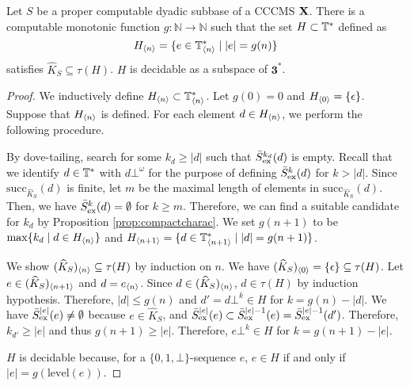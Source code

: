\documentclass{eptcs-modified}
\begin{document}
\begin{lemma}\label{lemma:H}
Let $S$ be a proper computable dyadic subbase of a CCCMS $\mathbf{X}$.
There is a computable monotonic function $g : \mathbb{N} \to \mathbb{N}$ such that
the set $H \subset \mathbb{T}^*$ defined as
$${{H_{{\langle n\rangle}}}} = \{e \in {{\mathbb{T}^*_{{\langle n\rangle}}}} \mid |e| = g(n)\}$$
satisfies $\widehat{K}_S \subseteq \tau(H)$.
$H$ is decidable as a subspace of $\mathbf{3}^*$.
\label{lem:H}

\begin{proof}
We inductively define ${{{H_{{\langle n\rangle}}}}} \subset {{{\mathbb{T}^*_{{\langle n\rangle}}}}}$.
Let $g(0) = 0$ and ${{H_{{\langle0\rangle}}}} = \{\epsilon\}$.
Suppose that ${{{H_{{\langle n\rangle}}}}}$ is defined.
For each element $d \in {{{H_{{\langle n\rangle}}}}}$, we perform the following procedure.

By dove-tailing, search for some $ k_d \geq |d|$ such that $\bar{S}_{\mathrm{ex}}^{k_d}(d)$ is empty.
Recall that we identify $d \in \mathbb{T}^*$ with $d\bot^\omega$ for the purpose of defining $\bar{S}_{\mathrm{ex}}^k(d)$ for $k > |d|$.
Since $\mathrm{succ}_{\widehat{K}_{S}}(d)$ is finite, let $m$ be the maximal length
of elements in $\mathrm{succ}_{\widehat{K}_{S}}(d)$.  Then,
we have $\bar{S}_{\mathrm{ex}}^k(d) = \emptyset$ for $k \geq m$.
Therefore, we can find a suitable candidate for $k_d$
by Proposition \ref{prop:compactcharac}.
We set $g(n+1)$ to be $\max \{k_d \mid d \in {{{H_{{\langle n\rangle}}}}}\}$ and
${{{H_{{\langle n+1\rangle}}}}} = \{d \in {{{\mathbb{T}^*_{{\langle n+1\rangle}}}}} \mid |d| = g(n+1)\}$.

We show ${{{(\widehat{K}_S)_{{\langle n\rangle}}}}} \subseteq \tau(H)$ by induction on $n$.
We have ${{{(\widehat{K}_S)_{{\langle0\rangle}}}}} = \{\epsilon\} \subseteq \tau(H)$.
Let $e \in {{(\widehat{K}_S)_{{\langle n+1\rangle}}}}$ and $d = {{e_{{\langle n\rangle}}}}$.
Since $d \in {{(\widehat{K}_S)_{{\langle n\rangle}}}}$, $d \in \tau(H)$ by induction hypothesis.
Therefore, $|d| \leq g(n)$ and $d' = d\bot^k \in H$ for $k = g(n) - |d|$.
We have $\bar{S}_{\mathrm{ex}}^{|e|}(e) \ne \emptyset$ because $e \in \widehat{K}_S$,
and $\bar{S}_{\mathrm{ex}}^{|e|}(e) \subset \bar{S}_{\mathrm{ex}}^{|e|-1}(e) = \bar{S}_{\mathrm{ex}}^{|e|-1}(d')$.
Therefore, $k_{d'} \geq |e|$ and thus $g(n+1) \geq |e|$.
Therefore, $e\bot^k \in H$ for $k = g(n+1) - |e|$.

$H$ is decidable because,
for a $\{0,1,\bot\}$-sequence $e$, $e \in H$ if and only if $|e| = g(\mathrm{level}(e))$.

\end{proof}
\end{lemma}
\end{document}
